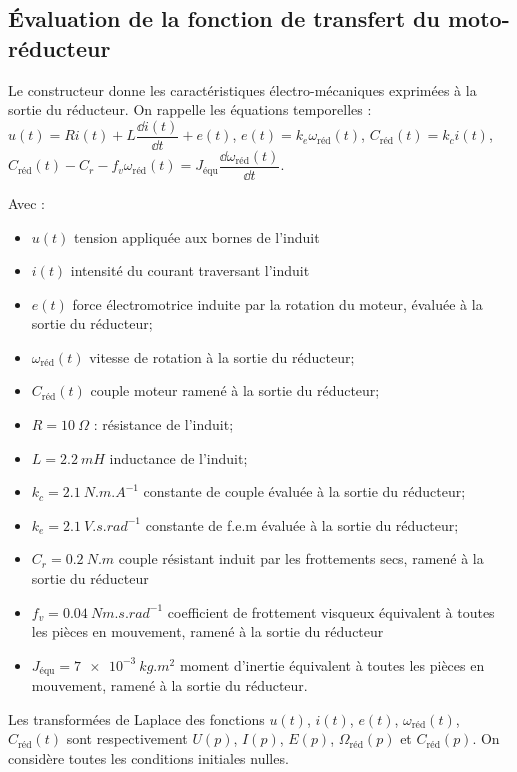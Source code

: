 \begin{multicols}{2}
\subsection*{Évaluation de la fonction de transfert du moto-réducteur}
Le constructeur donne les caractéristiques électro-mécaniques exprimées à la sortie du réducteur.
On rappelle les équations temporelles :
$u(t) = R i(t) + L \dfrac{\dd i(t)}{\dd t} + e(t)$, $e(t) = k_e  \omega_{\text{réd}}(t)$, 
$C_{\text{réd}} (t)= k_c  i(t)$, $C_{\text{réd}} (t) - C_r - f_v \omega_{\text{réd}}(t)= J_{\text{équ}} \dfrac{\dd \omega_{\text{réd}}(t)}{\dd t}$. 

Avec :
\begin{itemize}
\item $u(t)$ tension appliquée aux bornes de l’induit 
\item $i(t)$ intensité du courant traversant l’induit
\item $e(t)$ force électromotrice induite par la rotation du moteur, évaluée à la  sortie du réducteur;
\item $\omega_{\text{réd}}(t)$ vitesse de rotation à la sortie du réducteur;
\item $C_{\text{réd}} (t)$ couple moteur ramené à la sortie du réducteur;
\item $R = \SI{10}{\Omega}$ : résistance de l’induit;
\item $L = \SI{2,2}{mH}$ inductance de l’induit;
\item $k_c = \SI{2,1}{N.m.A^{-1}}$ constante de couple évaluée à la sortie du réducteur;
\item $k_e = \SI{2,1}{V.s.rad^{-1}}$ constante de f.e.m évaluée à la sortie du réducteur;
\item $C_r = \SI{0,2}{N.m}$ couple résistant induit par les frottements secs, ramené à la sortie du réducteur 
\item $f_v = \SI{0,04}{Nm.s.rad^{-1}}$ coefficient de frottement visqueux équivalent à toutes les pièces en mouvement, ramené à la sortie du réducteur 
\item $J_{\text{équ}} = \SI{7e-3}{kg.m^2}$ moment d’inertie équivalent à toutes les pièces en mouvement, ramené à la sortie du réducteur. 
\end{itemize}

Les transformées de Laplace des fonctions $u(t)$, $i(t)$, $e(t)$, $\omega_{\text{réd}}(t)$,  $C_{\text{réd}}(t)$ sont respectivement $U(p)$, $I(p)$, $E(p)$, $\Omega_{\text{réd}}(p)$ et $C_{\text{réd}}(p)$. On considère toutes les conditions initiales nulles.


\end{multicols}
